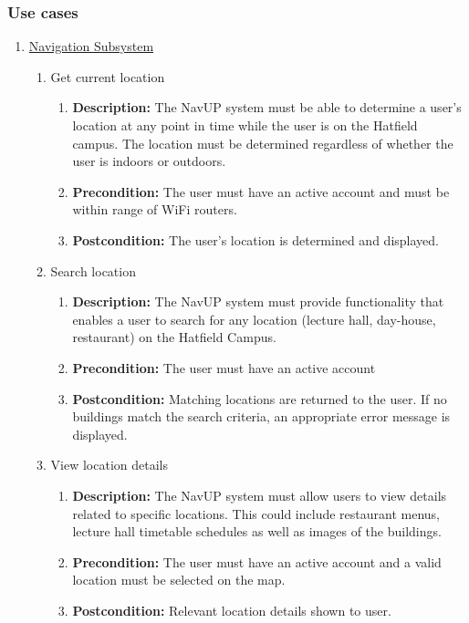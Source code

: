 \documentclass{article}
\begin{document}
	\subsubsection{Use cases}
	\begin{enumerate}
		\item \underline{Navigation Subsystem}
			
		
	\begin{enumerate}
		\item Get current location
		\begin{enumerate}
			\item \textbf{Description:} The NavUP system must be able to determine a user’s location at any point in time while the user is on the Hatfield campus. The location must be determined regardless of whether the user is indoors or outdoors.
			\item \textbf{Precondition:} The user must have an active account and must be within range of WiFi routers.
			\item \textbf{Postcondition:} The user’s location is determined and displayed.\newline
		\end{enumerate}
		
		\item Search location
		\begin{enumerate}
			\item \textbf{Description:} The NavUP system must provide functionality that enables a user to search for any location (lecture hall, day-house, restaurant) on the Hatfield Campus.
			\item \textbf{Precondition:} The user must have an active account
			\item \textbf{Postcondition:} Matching locations are returned to the user. If no buildings match the search criteria, an appropriate error message is displayed.\newline
		\end{enumerate}
		
		
		\item View location details
		\begin{enumerate}
			\item \textbf{Description:} The NavUP system must allow users to view details related to specific locations. This could include restaurant menus, lecture hall timetable schedules as well as images of the buildings.
			\item \textbf{Precondition:} The user must have an active account and a valid location must be selected on the map.
			\item \textbf{Postcondition:} Relevant location details shown to user.\newline
		\end{enumerate}
		

\end{enumerate}
\end{enumerate}
\end{document}

